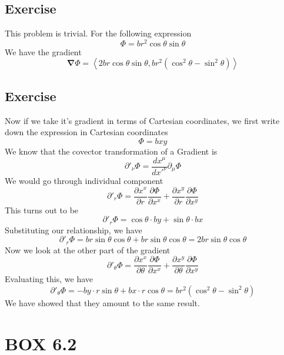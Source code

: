 \documentclass[12pt]{memoir}
\newcommand{\pypx}[2]{\frac{\partial #1}{\partial #2}}
\newcommand{\dydx}[2]{\frac{d #1}{d #2}}
\newcommand{\paren}[1]{\left( #1 \right)}
\newcommand{\tribkt}[1]{\left< #1 \right>}
\begin{document}
    \subsection{Exercise}

    This problem is trivial. For the following expression
    \[
    \Phi = br^2\cos\theta\sin\theta
    \]
    We have the gradient
    \[
    \boldsymbol\nabla\Phi = \tribkt{2br\cos\theta\sin\theta ,br^2\paren{\cos^2\theta-\sin^2\theta}}
    \]

    \subsection{Exercise}
    Now if we take it's gradient in terms of Cartesian coordinates, we first write down the expression in Cartesian coordinates
    \[
    \Phi = bxy
    \]
    We know that the covector transformation of a Gradient is
    \[
    \partial'_{\nu}\Phi = \dydx{x^{\mu}}{x'^\nu}\partial_{\mu}\Phi
    \]
    We would go through individual component
    \[
    \partial'_{r}\Phi = \pypx{x^x}{r}\pypx{\Phi}{x^x} + \pypx{x^y}{r}\pypx{\Phi}{x^y}
    \]
    This turns out to be
    \[
    \partial'_{r}\Phi = \cos\theta \cdot by + \sin\theta\cdot bx
    \]
    Substituting our relationship, we have
    \[
    \partial'_{r}\Phi = br\sin\theta\cos\theta + br\sin\theta\cos\theta = 2br\sin\theta\cos\theta
    \]
    Now we look at the other part of the gradient
    \[
    \partial'_{\theta}\Phi = \pypx{x^x}{\theta}\pypx{\Phi}{x^x} + \pypx{x^y}{\theta}\pypx{\Phi}{x^y}
    \]
    Evaluating this, we have
    \[
    \partial'_{\theta}\Phi = - by\cdot r\sin\theta  + bx \cdot r\cos\theta = br^2\paren{\cos^2\theta-\sin^2\theta}  
    \]
    We have showed that they amount to the same result. 


\section{BOX 6.2}
\end{document}
